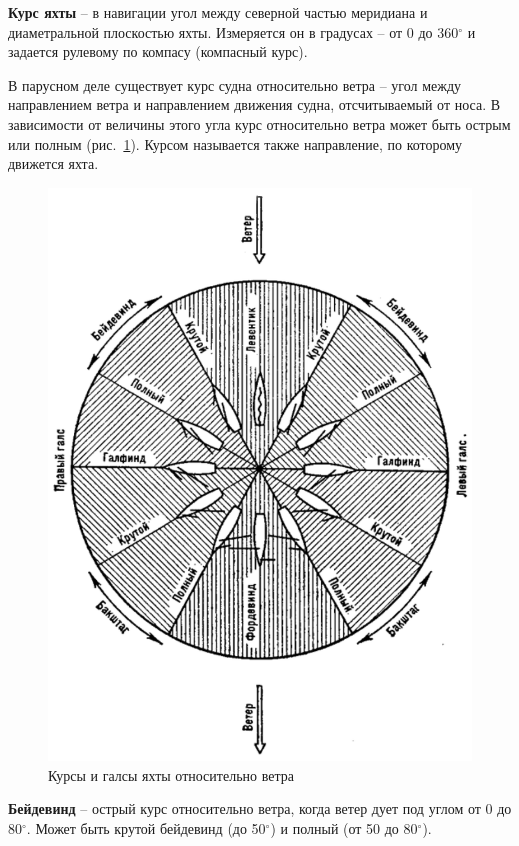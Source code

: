 \documentclass[a4paper, 12pt, twoside, final]{scrbook}
\begin{document}
\textbf{Курс яхты} \--- в навигации угол между северной частью меридиана и диаметральной плоскостью яхты. Измеряется он в градусах \--- от 0 до 360$^\circ$ и задается рулевому по компасу (компасный курс).

В парусном деле существует курс судна относительно ветра \--- угол между направлением ветра и направлением движения судна, отсчитываемый от носа. В зависимости от величины этого угла курс относительно ветра может быть острым или полным (рис.~\ref{fig:101}). Курсом называется также направление, по которому движется яхта.

\begin{figure}[htbp]
   \centering
   \includegraphics{pics/101_Kursy_i_galsy} %
   \caption{Курсы и галсы яхты относительно ветра}
   \label{fig:101}
\end{figure}

\textbf{Бейдевинд} \--- острый курс относительно ветра, когда ветер дует под углом от 0 до 80$^\circ$. Может быть крутой бейдевинд (до 50$^\circ$) и полный (от 50 до 80$^\circ$).
\end{document}
